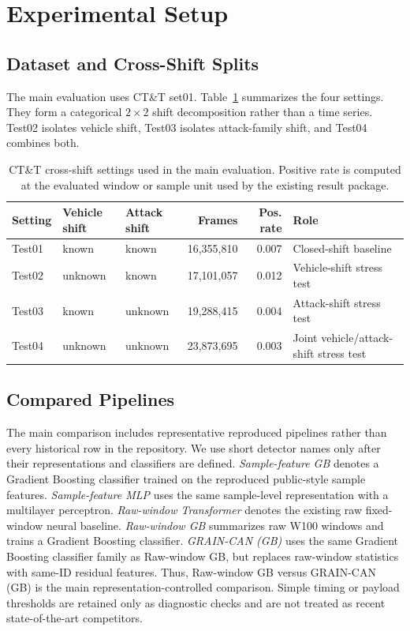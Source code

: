 \documentclass[runningheads]{llncs}
\newcommand{\method}{GRAIN-CAN}
\begin{document}
\section{Experimental Setup}
\subsection{Dataset and Cross-Shift Splits}
The main evaluation uses CT\&T set01. Table~\ref{tab:settings} summarizes the four settings. They form a categorical \(2 \times 2\) shift decomposition rather than a time series. Test02 isolates vehicle shift, Test03 isolates attack-family shift, and Test04 combines both.

\begin{table}[t]
\centering
\caption{CT\&T cross-shift settings used in the main evaluation. Positive rate is computed at the evaluated window or sample unit used by the existing result package.}
\label{tab:settings}
\small
\setlength{\tabcolsep}{4pt}
\begin{tabularx}{\textwidth}{p{} p{} p{} r r X}
\toprule
Setting & Vehicle shift & Attack shift & Frames & Pos. rate & Role \\
\midrule
Test01 & known & known & 16,355,810 & 0.007 & Closed-shift baseline \\
Test02 & unknown & known & 17,101,057 & 0.012 & Vehicle-shift stress test \\
Test03 & known & unknown & 19,288,415 & 0.004 & Attack-shift stress test \\
Test04 & unknown & unknown & 23,873,695 & 0.003 & Joint vehicle/attack-shift stress test \\
\bottomrule
\end{tabularx}
\end{table}

\subsection{Compared Pipelines}
The main comparison includes representative reproduced pipelines rather than every historical row in the repository. We use short detector names only after their representations and classifiers are defined. \emph{Sample-feature GB} denotes a Gradient Boosting classifier trained on the reproduced public-style sample features. \emph{Sample-feature MLP} uses the same sample-level representation with a multilayer perceptron. \emph{Raw-window Transformer} denotes the existing raw fixed-window neural baseline. \emph{Raw-window GB} summarizes raw W100 windows and trains a Gradient Boosting classifier. \emph{\method{} (GB)} uses the same Gradient Boosting classifier family as Raw-window GB, but replaces raw-window statistics with same-ID residual features. Thus, Raw-window GB versus \method{} (GB) is the main representation-controlled comparison. Simple timing or payload thresholds are retained only as diagnostic checks and are not treated as recent state-of-the-art competitors.
\end{document}
